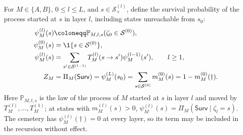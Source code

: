 \begin{theoremenv}\label{ptnb:thm:conditioned-survival}
For $M\in\{A,B\}$, $0\le l\le L$, and $s\in\mathcal S_+^{(l)}$, define the survival probability of the process started at $s$ in layer $l$, including states unreachable from $s_0$:
\begin{align}
 \psi_M^{(l)}(s)&\coloneqq\mathbb P_{M,l,s}(\zeta_0\in\mathcal S^{(0)}),
 \label{ptnb:eq:survival-function}\\
 \psi_M^{(0)}(s)&=\1\{s\in\mathcal S^{(0)}\},
 \label{ptnb:eq:survival-boundary}\\
 \psi_M^{(l)}(s)&=\sum_{s'\in\mathcal S^{(l-1)}}T_M^{(l)}(s\to s')\psi_M^{(l-1)}(s'),\qquad l\ge1,
 \label{ptnb:eq:survival-recursion}\\
 Z_M&=\Pi_M(\mathsf{Surv})=\psi_M^{(L)}(s_0)
 =\sum_{s\in\mathcal S^{(0)}}m_M^{(0)}(s)=1-m_M^{(0)}(\dagger).
 \label{ptnb:eq:survival-mass}
\end{align}
Here $\mathbb P_{M,l,s}$ is the law of the process of $M$ started at $s$ in layer $l$ and moved by $T_M^{(l)},\dots,T_M^{(1)}$; at states with $m_M^{(l)}(s)>0$, $\psi_M^{(l)}(s)=\Pi_M(\mathsf{Surv}\mid\zeta_l=s)$.
The cemetery has $\psi_M^{(l)}(\dagger)=0$ at every layer, so its term may be included in the recursion without effect.


\end{theoremenv}
